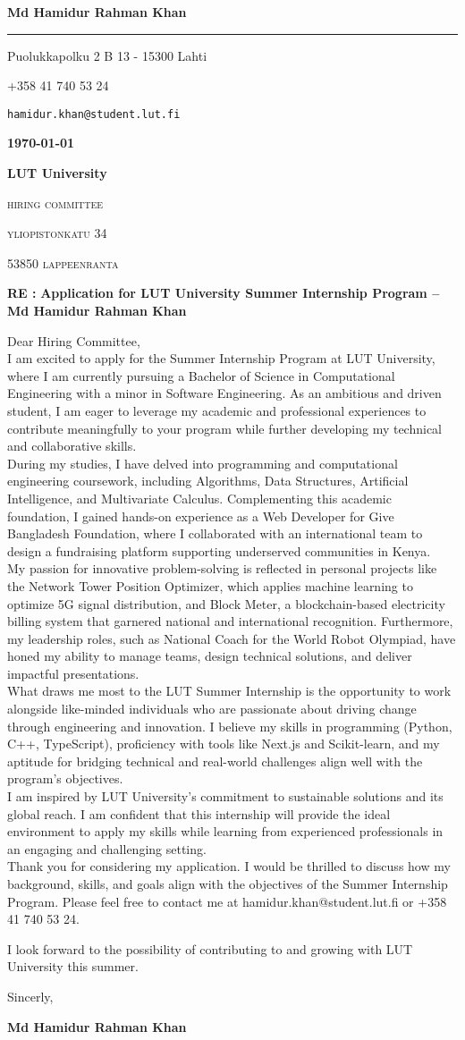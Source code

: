 \documentclass[12pt]{article}
\newcommand{\firstname}{Md Hamidur Rahman Khan}
\newcommand{\lastname}{}
\newcommand{\mainColor}{redBlood} %
\newlength{\spacebox}
\newcommand{\shspace}{\hspace*{0.8em}}
\newcommand{\xvspace}{\vspace*{0.1em}}
\newcommand{\svspace}{\vspace*{0.5em}}
\newcommand{\mvspace}{\vspace*{1.5em}}
\newcommand{\hvspace}{\vspace*{2.5em}}
\newcommand{\negmvspace}{\vspace*{-1em}}
\newcommand{\userInfo}[4]{
    \begin{flushleft}
        \Huge
        \color{black}
        \textbf{\firstname}
        \color{\mainColor}
        \noindent\rule{19.1cm}{0.8pt}
        \color{grayShy}
        \small
        \par
        \parbox{7\spacebox} {
            \faMap \shspace #1 - #2 \par \svspace
            \faPhone \shspace #3 \par \svspace
            \faEnvelopeOpen \shspace \texttt{#4} \par \svspace
        }
        \color{\mainColor}
        \mvspace
    \end{flushleft}
    \negmvspace
}
\newcommand{\companyInfo}[4]{
    \begin{flushright}
        \parbox{4\spacebox}{
            \raggedleft
            \small
            \textbf{\today}\par
            \xvspace
            \textbf{#1}\par
            \mvspace
            \color{grayShy} \textsc{\MakeLowercase{#2}}\par
            \xvspace
            \textsc{\MakeLowercase{#3}}\par
            \xvspace
            \textsc{\MakeLowercase{#4}}\par 
            \color{black}
        }
    \end{flushright} 
    \hvspace
}
\newcommand{\object}[1]{
    \small
    \color{\mainColor} \textbf{RE :} \color{black} \textbf{#1} \par
}
\newcommand{\content}[2]{
    \mvspace
    \begin{flushleft}
        \parbox{10.3\spacebox}{
          #1\par
          \svspace
          #2
        }\par
    \end{flushleft}
}
\newcommand{\signature}{
    \svspace
    \parbox{3\spacebox}{
      Sincerly,\par
      \svspace \hspace{-0.3em}
      \textbf{\color{black} \firstname}\par
      \svspace \svspace
    }\par
}
\begin{document}
\selectfont
\userInfo{Puolukkapolku 2 B 13}{15300 Lahti}{+358 41 740 53 24}{hamidur.khan@student.lut.fi}
\companyInfo{LUT University}{Hiring Committee}{Yliopistonkatu 34}{53850 Lappeenranta}
\object{Application for LUT University Summer Internship Program – Md Hamidur Rahman Khan}
\content{
  Dear Hiring Committee, \\
  
  I am excited to apply for the Summer Internship Program at LUT University, where I am currently pursuing a Bachelor of Science in Computational Engineering with a minor in Software Engineering. As an ambitious and driven student, I am eager to leverage my academic and professional experiences to contribute meaningfully to your program while further developing my technical and collaborative skills. \\

  During my studies, I have delved into programming and computational engineering coursework, including Algorithms, Data Structures, Artificial Intelligence, and Multivariate Calculus. Complementing this academic foundation, I gained hands-on experience as a Web Developer for Give Bangladesh Foundation, where I collaborated with an international team to design a fundraising platform supporting underserved communities in Kenya. \\

  My passion for innovative problem-solving is reflected in personal projects like the Network Tower Position Optimizer, which applies machine learning to optimize 5G signal distribution, and Block Meter, a blockchain-based electricity billing system that garnered national and international recognition. Furthermore, my leadership roles, such as National Coach for the World Robot Olympiad, have honed my ability to manage teams, design technical solutions, and deliver impactful presentations. \\
  
  What draws me most to the LUT Summer Internship is the opportunity to work alongside like-minded individuals who are passionate about driving change through engineering and innovation. I believe my skills in programming (Python, C++, TypeScript), proficiency with tools like Next.js and Scikit-learn, and my aptitude for bridging technical and real-world challenges align well with the program's objectives. \\
  
  I am inspired by LUT University’s commitment to sustainable solutions and its global reach. I am confident that this internship will provide the ideal environment to apply my skills while learning from experienced professionals in an engaging and challenging setting. \\
  
  Thank you for considering my application. I would be thrilled to discuss how my background, skills, and goals align with the objectives of the Summer Internship Program. Please feel free to contact me at hamidur.khan@student.lut.fi or +358 41 740 53 24. \\

}{I look forward to the possibility of contributing to and growing with LUT University this summer.}
\signature
\end{document}
